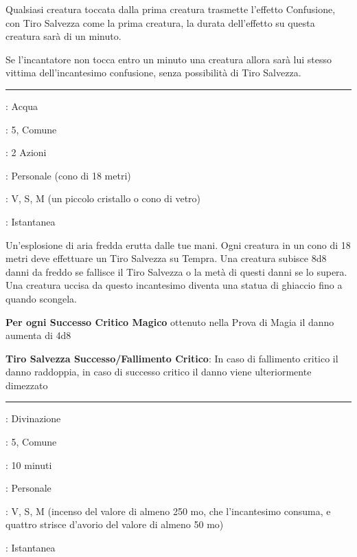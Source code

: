 \begin{multicols}{2}
Qualsiasi creatura toccata dalla prima creatura trasmette l'effetto Confusione, con Tiro Salvezza come la prima creatura, la durata dell'effetto su questa creatura sarà di un minuto.

Se l'incantatore non tocca entro un minuto una creatura allora sarà lui stesso vittima dell'incantesimo confusione, senza possibilità di Tiro Salvezza.

\smallskip\noindent\rule{\linewidth}{2pt} \hypertarget{Cono di Freddo}{}\medskip{}
\noindent
\begin{description}[noitemsep, topsep=0pt, parsep=0pt, partopsep=0pt, leftmargin=0cm, labelwidth=2.8cm]
	\item[\textbf{Lista di Magia}]: Acqua
	\item[\textbf{Livello}]: 5, Comune
	\item[\textbf{T. di Lancio}]: 2 Azioni
	\item[\textbf{Gittata}]: Personale (cono di 18 metri)
	\item[\textbf{Componenti}]: V, S, M (un piccolo cristallo o cono di vetro)
	\item[\textbf{Durata}]: Istantanea
\end{description}

Un'esplosione di aria fredda erutta dalle tue mani. Ogni creatura in un cono di 18 metri deve effettuare un Tiro Salvezza su Tempra. Una creatura subisce 8d8 danni da freddo se fallisce il Tiro Salvezza o la metà di questi danni se lo supera. Una creatura uccisa da questo incantesimo diventa una statua di ghiaccio fino a quando scongela.

\textbf{Per ogni Successo Critico Magico} ottenuto nella Prova di Magia il danno aumenta di 4d8

\textbf{Tiro Salvezza Successo/Fallimento Critico}: In caso di fallimento critico il danno raddoppia, in caso di successo critico il danno viene ulteriormente dimezzato

\smallskip\noindent\rule{\linewidth}{2pt} \hypertarget{Conoscenza delle Leggende}{}\medskip{}
\noindent
\begin{description}[noitemsep, topsep=0pt, parsep=0pt, partopsep=0pt, leftmargin=0cm, labelwidth=2.8cm]
	\item[\textbf{Lista di Magia}]: Divinazione
	\item[\textbf{Livello}]: 5, Comune
	\item[\textbf{T. di Lancio}]: 10 minuti
	\item[\textbf{Gittata}]: Personale
	\item[\textbf{Componenti}]: V, S, M (incenso del valore di almeno 250 mo, che l'incantesimo consuma, e quattro strisce d'avorio del valore di almeno 50 mo)
	\item[\textbf{Durata}]: Istantanea
\end{description}


\end{multicols}
